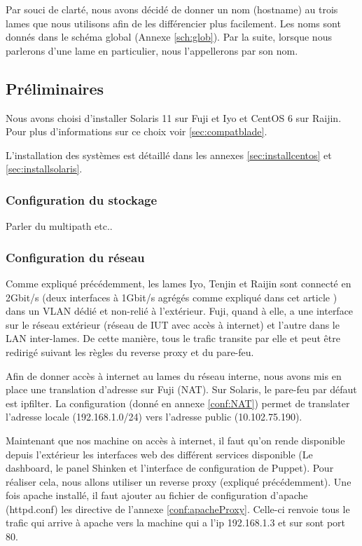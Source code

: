 \documentclass[a4paper,oneside]{report}
\begin{document}
Par souci de clarté, nous avons décidé de donner un nom (hostname) au trois lames que nous utilisons afin de les différencier plus facilement.
Les noms sont donnés dans le schéma global (Annexe \ref{sch:glob}).
Par la suite, lorsque nous parlerons d'une lame en particulier, nous l'appellerons par son nom.

\subsection{Préliminaires}
Nous avons choisi d'installer Solaris 11 sur Fuji et Iyo et CentOS 6 sur Raijin.
Pour plus d'informations sur ce choix voir \ref{sec:compatblade}.

L'installation des systèmes est détaillé dans les annexes \ref{sec:installcentos} et \ref{sec:installsolaris}.

\subsubsection{Configuration du stockage}
Parler du multipath etc..

\subsubsection{Configuration du réseau}
Comme expliqué précédemment, les lames Iyo, Tenjin et Raijin sont connecté en 2Gbit/s (deux interfaces à 1Gbit/s agrégés comme expliqué dans cet article \cite{SolarisLA}) dans un VLAN dédié et non-relié à l'extérieur.
Fuji, quand à elle, a une interface sur le réseau extérieur (réseau de IUT avec accès à internet) et l'autre dans le LAN inter-lames.
De cette manière, tous le trafic transite par elle et peut être redirigé suivant les règles du reverse proxy et du pare-feu. 

Afin de donner accès à internet au lames du réseau interne, nous avons mis en place une translation d'adresse sur Fuji (NAT).
Sur Solaris, le pare-feu par défaut est ipfilter. La configuration (donné en annexe \ref{conf:NAT}) permet de translater l'adresse locale (192.168.1.0/24) vers l'adresse public (10.102.75.190).

Maintenant que nos machine on accès à internet, il faut qu'on rende disponible depuis l'extérieur les interfaces web des différent services disponible (Le dashboard, le panel Shinken et l'interface de configuration de Puppet).
Pour réaliser cela, nous allons utiliser un reverse proxy (expliqué précédemment). Une fois apache installé, il faut ajouter au fichier de configuration d'apache (httpd.conf) les directive de l'annexe \ref{conf:apacheProxy}.
Celle-ci renvoie tous le trafic qui arrive à apache vers la machine qui a l'ip 192.168.1.3 et sur sont port 80.
\end{document}
